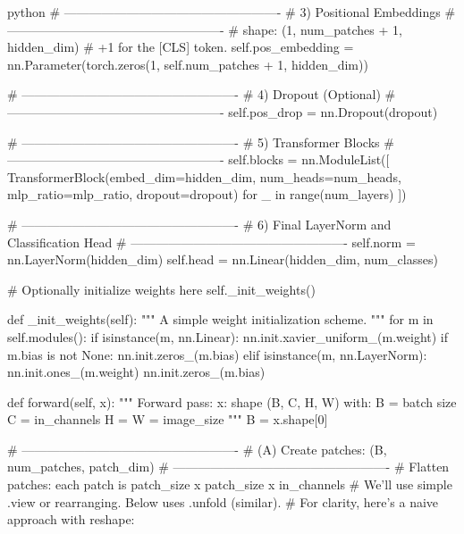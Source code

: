 \begin{mintedbox}{python}
        # ----------------------------------------------------
        # 3) Positional Embeddings
        # ----------------------------------------------------
        # shape: (1, num_patches + 1, hidden_dim)
        # +1 for the [CLS] token.
        self.pos_embedding = nn.Parameter(torch.zeros(1, self.num_patches + 1, hidden_dim))
        
        # ----------------------------------------------------
        # 4) Dropout (Optional)
        # ----------------------------------------------------
        self.pos_drop = nn.Dropout(dropout)
        
        # ----------------------------------------------------
        # 5) Transformer Blocks
        # ----------------------------------------------------
        self.blocks = nn.ModuleList([
        TransformerBlock(embed_dim=hidden_dim,
        num_heads=num_heads,
        mlp_ratio=mlp_ratio,
        dropout=dropout)
        for _ in range(num_layers)
        ])
        
        # ----------------------------------------------------
        # 6) Final LayerNorm and Classification Head
        # ----------------------------------------------------
        self.norm = nn.LayerNorm(hidden_dim)
        self.head = nn.Linear(hidden_dim, num_classes)
        
        # Optionally initialize weights here
        self._init_weights()

    def _init_weights(self):
        """
        A simple weight initialization scheme.
        """
        for m in self.modules():
            if isinstance(m, nn.Linear):
                nn.init.xavier_uniform_(m.weight)
            if m.bias is not None:
                nn.init.zeros_(m.bias)
            elif isinstance(m, nn.LayerNorm):
                nn.init.ones_(m.weight)
                nn.init.zeros_(m.bias)
    
    def forward(self, x):
        """
        Forward pass:
        x: shape (B, C, H, W) with:
        B = batch size
        C = in_channels
        H = W = image_size
        """
        B = x.shape[0]
        
        # ----------------------------------------------------
        # (A) Create patches: (B, num_patches, patch_dim)
        # ----------------------------------------------------
        # Flatten patches: each patch is patch_size x patch_size x in_channels
        # We'll use simple .view or rearranging. Below uses .unfold (similar).
        # For clarity, here's a naive approach with reshape:
        

\end{mintedbox}
